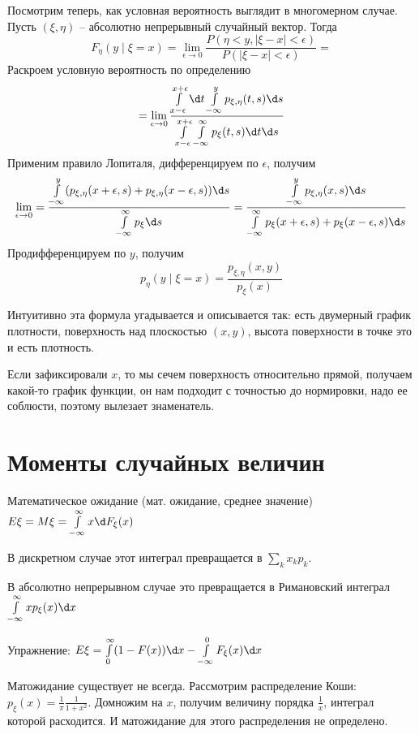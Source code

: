 Посмотрим теперь, как условная вероятность выглядит в многомерном случае.
Пусть $(\xi, \eta)$ -- абсолютно непрерывный случайный вектор. Тогда
$$F_{\eta}(y \mid \xi = x) = \lim\limits_{\epsilon \to 0} \frac{P(\eta < y, |\xi - x| < \epsilon)}{P(|\xi - x| < \epsilon)} =$$
Раскроем условную вероятность по определению
$$ = \lim\limits_{\epsilon \to 0} \frac{\int\limits_{x - \epsilon}^{x + \epsilon} \d t \int\limits_{-\infty}^y p_{\xi, \eta}(t, s) \d s}{\int\limits_{x - \epsilon}^{x + \epsilon} \int\limits_{-\infty}^{\infty}p_\xi(t, s) \d t \d s}$$
Применим правило Лопиталя, дифференцируем по $\epsilon$, получим
$$\lim\limits_{\epsilon \to 0} = \frac{\int\limits_{-\infty}^y (p_{\xi, \eta}(x + \epsilon, s) + p_{\xi, \eta}(x - \epsilon, s)) \d s}{\int\limits_{-\infty}^{\infty} p_\xi\d s} = \frac{\int\limits_{-\infty}^y p_{\xi, \eta}(x, s) \d s}{\int\limits_{-\infty}^{\infty}p_\xi(x + \epsilon, s) + p_\xi(x - \epsilon, s)\d s}$$
Продифференцируем по $y$, получим
$$p_{\eta}(y \mid \xi = x) = \frac{p_{\xi, \eta}(x, y)}{p_{\xi}(x)}$$

Интуитивно эта формула угадывается и описывается так: есть двумерный график плотности, поверхность над плоскостью $(x, y)$, высота поверхности в точке это и есть плотность.

Если зафиксировали $x$, то мы сечем поверхность относительно прямой, получаем какой-то график функции, он нам подходит с точностью до нормировки, надо ее соблюсти, поэтому вылезает знаменатель.

\section{Моменты случайных величин}
\begin{Def}
    Математическое ожидание (мат. ожидание, среднее значение) $E\xi = M\xi = \int\limits_{-\infty}^\infty x \d F_\xi(x)$

    В дискретном случае этот интеграл превращается в $\sum\limits_k x_k p_k$.

    В абсолютно непрерывном случае это превращается в Римановский интеграл $\int\limits_{-\infty}^\infty xp_\xi(x) \d x$
\end{Def}

Упражнение: $E\xi = \int\limits_0^\infty (1 - F(x)) \d x - \int\limits_{-\infty}^0 F_\xi(x) \d x$

\begin{exmp}
Матожидание существует не всегда.
Рассмотрим распределение Коши: $p_\xi(x) = \frac{1}{\pi}\frac{1}{1 + x^2}$. Домножим на $x$, получим величину порядка $\frac{1}{x}$, интеграл которой расходится. 
И матожидание для этого распределения не определено.
\end{exmp}

